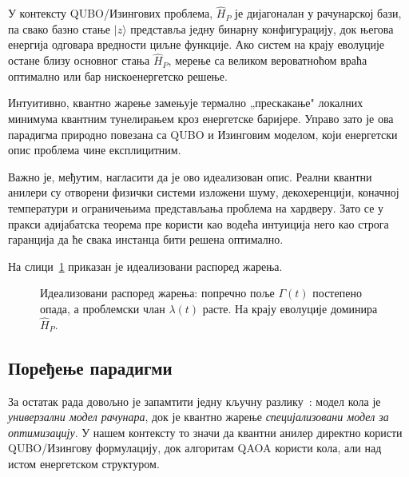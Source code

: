 У контексту QUBO/Изингових проблема, $\hat{H}_P$ је дијагоналан у
рачунарској бази, па свако базно стање $|z\rangle$ представља једну
бинарну конфигурацију, док његова енергија одговара вредности циљне
функције. Ако систем на крају еволуције остане близу основног стања
$\hat{H}_P$, мерење са великом вероватноћом враћа оптимално или бар
нискоенергетско решење.

Интуитивно, квантно жарење замењује термално „прескакање" локалних
минимума квантним тунелирањем кроз енергетске баријере. Управо зато је
ова парадигма природно повезана са QUBO и Изинговим моделом, који
енергетски опис проблема чине експлицитним.

Важно је, међутим, нагласити да је ово идеализован опис. Реални
квантни анилери су отворени физички системи изложени шуму, декохеренцији,
коначној температури и ограничењима представљања проблема на хардверу.
Зато се у пракси адијабатска теорема пре користи као водећа интуиција
него као строга гаранција да ће свака инстанца бити решена оптимално.

На слици~\ref{fig:annealing-schedule} приказан је идеализовани распоред
жарења.

\begin{figure}[h]
\centering
{}
\caption{Идеализовани распоред жарења: попречно поље $\Gamma(t)$
         постепено опада, а проблемски члан $\lambda(t)$ расте.
         На крају еволуције доминира $\hat{H}_P$.}
\label{fig:annealing-schedule}
\end{figure}

\subsection{Поређење парадигми}

За остатак рада довољно је запамтити једну кључну разлику~\cite{wong2022,mcgeoch2014}:
модел кола је \emph{универзални модел рачунара}, док је квантно
жарење \emph{специјализовани модел за оптимизацију}. У нашем контексту
то значи да квантни анилер директно  користи QUBO/Изингову
формулацију, док алгоритам QAOA користи кола, али над истом
енергетском структуром.

